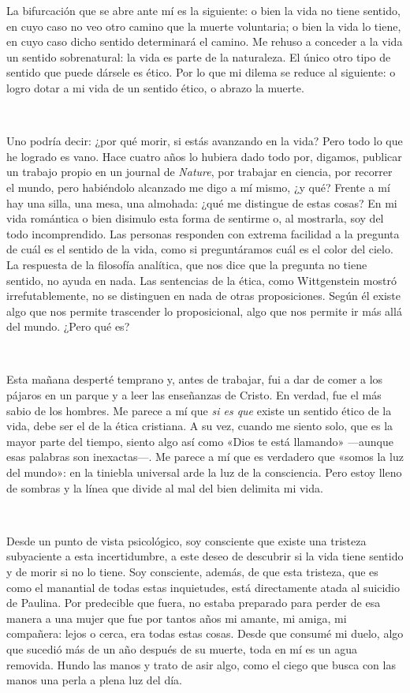 \documentclass[a4paper, 12pt]{article}
\begin{document}
La bifurcación que se abre ante mí es la siguiente: o bien la vida no tiene
sentido, en cuyo caso no veo otro camino que la muerte voluntaria; o bien la
vida lo tiene, en cuyo caso dicho sentido determinará el camino. Me rehuso a
conceder a la vida un sentido sobrenatural: la vida es parte de la naturaleza.
El único otro tipo de sentido que puede dársele es ético. Por lo que mi dilema
se reduce al siguiente: o logro dotar a mi vida de un sentido ético, o abrazo la
muerte.

~ 

Uno podría decir: ¿por qué morir, si estás avanzando en la vida? Pero todo lo
que he logrado es vano. Hace cuatro años lo hubiera dado todo por, digamos,
publicar un trabajo propio en un journal de \textit{Nature}, por trabajar en
ciencia, por recorrer el mundo, pero habiéndolo alcanzado me digo a mí mismo, ¿y
qué? Frente a mí hay una silla, una mesa, una almohada: ¿qué me distingue de
estas cosas? En mi vida romántica o bien disimulo esta forma de sentirme o, al
mostrarla, soy del todo incomprendido. Las personas responden con extrema
facilidad a la pregunta de cuál es el sentido de la vida, como si preguntáramos
cuál es el color del cielo. La respuesta de la filosofía analítica, que nos dice
que la pregunta no tiene sentido, no ayuda en nada. Las sentencias de la ética,
como Wittgenstein mostró irrefutablemente, no se distinguen en nada de otras
proposiciones. Según él existe algo que nos permite trascender lo proposicional,
algo que nos permite ir más allá del mundo. ¿Pero qué es?

~ 

Esta mañana desperté temprano y, antes de trabajar, fui a dar de comer a los
pájaros en un parque y a leer las enseñanzas de Cristo. En verdad, fue el más
sabio de los hombres. Me parece a mí que \textit{si es que} existe un sentido
ético de la vida, debe ser el de la ética cristiana. A su vez, cuando me siento
solo, que es la mayor parte del tiempo, siento algo así como «Dios te está
llamando» ---aunque esas palabras son inexactas---. Me parece a mí que es
verdadero que «somos la luz del mundo»: en la tiniebla universal arde la luz de
la consciencia. Pero estoy lleno de sombras y la línea que divide al mal del
bien delimita mi vida.

~ 

Desde un punto de vista psicológico, soy consciente que existe una tristeza
subyaciente a esta incertidumbre, a este deseo de descubrir si la vida tiene
sentido y de morir si no lo tiene. Soy consciente, además, de que esta tristeza,
que es como el manantial de todas estas inquietudes, está directamente atada al
suicidio de Paulina. Por predecible que fuera, no estaba preparado para perder
de esa manera a una mujer que fue por tantos años mi amante, mi amiga, mi
compañera: lejos o cerca, era todas estas cosas. Desde que consumé mi duelo,
algo que sucedió más de un año después de su muerte, toda en mí es un agua
removida. Hundo las manos y trato de asir algo, como el ciego que busca con las
manos una perla a plena luz del día.
\end{document}
